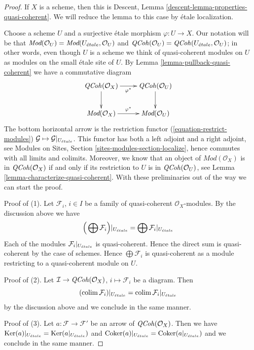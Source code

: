 \begin{proof}
If $X$ is a scheme, then this is
Descent, Lemma \ref{descent-lemma-properties-quasi-coherent}.
We will reduce the lemma to this case by \'etale localization.

\medskip\noindent
Choose a scheme $U$ and a surjective \'etale morphism $\varphi : U \to X$.
Our notation will be that $\textit{Mod}(\mathcal{O}_U) =
\textit{Mod}(U_{\acute{e}tale}, \mathcal{O}_U)$ and
$\mathit{QCoh}(\mathcal{O}_U) = \mathit{QCoh}(U_{\acute{e}tale}, \mathcal{O}_U)$; in other
words, even though $U$ is a scheme we think of quasi-coherent
modules on $U$ as modules on the small \'etale site of $U$.
By Lemma \ref{lemma-pullback-quasi-coherent} we have a commutative diagram
$$
\xymatrix{
\QCoh(\mathcal{O}_X) \ar[r]_{\varphi^*} \ar[d] &
\QCoh(\mathcal{O}_U) \ar[d] \\
\textit{Mod}(\mathcal{O}_X) \ar[r]^{\varphi^*} &
\textit{Mod}(\mathcal{O}_U)
}
$$
The bottom horizontal arrow is the restriction functor
(\ref{equation-restrict-modules})
$\mathcal{G} \mapsto \mathcal{G}|_{U_{\acute{e}tale}}$.
This functor has both a left adjoint and a right adjoint, see
Modules on Sites, Section \ref{sites-modules-section-localize},
hence commutes with all limits and colimits.
Moreover, we know that an object of $\textit{Mod}(\mathcal{O}_X)$ is in
$\mathit{QCoh}(\mathcal{O}_X)$ if and only if its restriction to $U$ is in
$\mathit{QCoh}(\mathcal{O}_U)$, see
Lemma \ref{lemma-characterize-quasi-coherent}.
With these preliminaries out of the way we can start the proof.

\medskip\noindent
Proof of (1). Let $\mathcal{F}_i$, $i \in I$ be a family of quasi-coherent
$\mathcal{O}_X$-modules. By the discussion above we have
$$
\Big(\bigoplus \mathcal{F}_i\Big)|_{U_{\acute{e}tale}} =
\bigoplus \mathcal{F}_i|_{U_{\acute{e}tale}}
$$
Each of the modules $\mathcal{F}_i|_{U_{\acute{e}tale}}$ is quasi-coherent.
Hence the direct sum is quasi-coherent by the case of schemes.
Hence $\bigoplus \mathcal{F}_i$ is quasi-coherent as a module
restricting to a quasi-coherent module on $U$.

\medskip\noindent
Proof of (2). Let $\mathcal{I} \to \mathit{QCoh}(\mathcal{O}_X)$,
$i \mapsto \mathcal{F}_i$ be a diagram. Then
$$
(\mathop{\mathrm{colim}}\nolimits \mathcal{F}_i)|_{U_{\acute{e}tale}} = \mathop{\mathrm{colim}}\nolimits \mathcal{F}_i|_{U_{\acute{e}tale}}
$$
by the discussion above and we conclude in the same manner.

\medskip\noindent
Proof of (3). Let $a : \mathcal{F} \to \mathcal{F}'$
be an arrow of $\mathit{QCoh}(\mathcal{O}_X)$. Then
we have $\mathop{\mathrm{Ker}}(a)|_{U_{\acute{e}tale}} = \mathop{\mathrm{Ker}}(a|_{U_{\acute{e}tale}})$
and $\mathop{\mathrm{Coker}}(a)|_{U_{\acute{e}tale}} = \mathop{\mathrm{Coker}}(a|_{U_{\acute{e}tale}})$
and we conclude in the same manner.


\end{proof}
